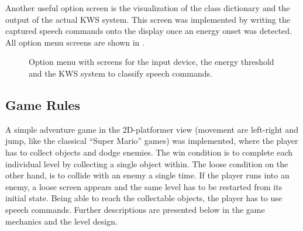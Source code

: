 Another useful option screen is the visualization of the class dictionary and the output of the actual KWS system.
This screen was implemented by writing the captured speech commands onto the display once an energy onset was detected.
All option menu screens are shown in .
\begin{figure}[!ht]
  \centering
  \qquad
  \qquad
  \caption{Option menu with screens for the input device, the energy threshold and the KWS system to classify speech commands.}
  \label{fig:game_design_menu_options}
\end{figure}
\FloatBarrier
\noindent



\subsection{Game Rules}\label{sec:game_design_rules}
A simple adventure game in the 2D-platformer view (movement are left-right and jump, like the classical \enquote{Super Mario} games) was implemented, where the player has to collect objects and dodge enemies.
The win condition is to complete each individual level by collecting a single object within. 
The loose condition on the other hand, is to collide with an enemy a single time.
If the player runs into an enemy, a loose screen appears and the same level has to be restarted from its initial state.
Being able to reach the collectable objects, the player has to use speech commands.
Further descriptions are presented below in the game mechanics and the level design.


